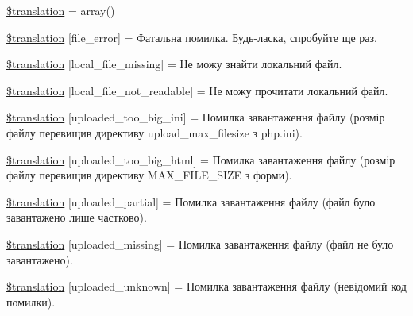 \begin{DoxyCompactItemize}
\item 
\hyperlink{class_8upload_8uk___u_a_8php_a1f198d410fecc3871ebdd468d343a5e3}{\$translation} = array()
\item 
\hyperlink{class_8upload_8uk___u_a_8php_ac7498e49b9771b04698029aa61c70821}{\$translation} \mbox{[}\textquotesingle{}file\+\_\+error\textquotesingle{}\mbox{]} = \textquotesingle{}Фатальна помилка. Будь-\/ласка, спробуйте ще раз.\textquotesingle{}
\item 
\hyperlink{class_8upload_8uk___u_a_8php_a6ec3d3a47ab70d77e7aa593e82ead10e}{\$translation} \mbox{[}\textquotesingle{}local\+\_\+file\+\_\+missing\textquotesingle{}\mbox{]} = \textquotesingle{}Не можу знайти локальний файл.\textquotesingle{}
\item 
\hyperlink{class_8upload_8uk___u_a_8php_a60104befef9b241f3a7a6a755618a4b3}{\$translation} \mbox{[}\textquotesingle{}local\+\_\+file\+\_\+not\+\_\+readable\textquotesingle{}\mbox{]} = \textquotesingle{}Не можу прочитати локальний файл.\textquotesingle{}
\item 
\hyperlink{class_8upload_8uk___u_a_8php_a6a08dcd0d3651fdd098568f6b2f0a42c}{\$translation} \mbox{[}\textquotesingle{}uploaded\+\_\+too\+\_\+big\+\_\+ini\textquotesingle{}\mbox{]} = \textquotesingle{}Помилка завантаження файлу (розмір файлу перевищив директиву upload\+\_\+max\+\_\+filesize з php.\+ini).\textquotesingle{}
\item 
\hyperlink{class_8upload_8uk___u_a_8php_a623d5b8b92169f57d7e43458aa911cbb}{\$translation} \mbox{[}\textquotesingle{}uploaded\+\_\+too\+\_\+big\+\_\+html\textquotesingle{}\mbox{]} = \textquotesingle{}Помилка завантаження файлу (розмір файлу перевищив директиву M\+A\+X\+\_\+\+F\+I\+L\+E\+\_\+\+S\+I\+Z\+E з форми).\textquotesingle{}
\item 
\hyperlink{class_8upload_8uk___u_a_8php_a967c17da21b0a2d3bd65cca3a9ca0ea8}{\$translation} \mbox{[}\textquotesingle{}uploaded\+\_\+partial\textquotesingle{}\mbox{]} = \textquotesingle{}Помилка завантаження файлу (файл було завантажено лише частково).\textquotesingle{}
\item 
\hyperlink{class_8upload_8uk___u_a_8php_a0cce433260be65f1f35853a6b4b8952b}{\$translation} \mbox{[}\textquotesingle{}uploaded\+\_\+missing\textquotesingle{}\mbox{]} = \textquotesingle{}Помилка завантаження файлу (файл не було завантажено).\textquotesingle{}
\item 
\hyperlink{class_8upload_8uk___u_a_8php_a4a9168e922b827e6a28b5db1c00774ca}{\$translation} \mbox{[}\textquotesingle{}uploaded\+\_\+unknown\textquotesingle{}\mbox{]} = \textquotesingle{}Помилка завантаження файлу (невідомий код помилки).\textquotesingle{}

\end{DoxyCompactItemize}
